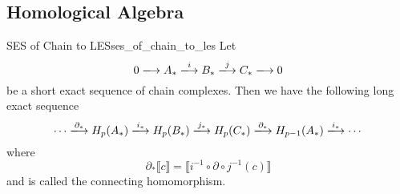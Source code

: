 \documentclass{article}
\begin{document}
\subsection{Homological Algebra}

\begin{theorem}{SES of Chain to LES}{ses_of_chain_to_les}
    Let
    \[ 0 \xlongrightarrow{} A_* \xlongrightarrow{i} B_* \xlongrightarrow{j} C_* \xlongrightarrow{} 0 \]
    be a short exact sequence of chain complexes.
    Then we have the following long exact sequence
    \[ \cdots \xlongrightarrow{\partial_*} H_p(A_*) \xlongrightarrow{i_*} H_p(B_*) \xlongrightarrow{j_*} H_p(C_*) \xlongrightarrow{\partial_*} H_{p-1}(A_*) \xlongrightarrow{i_*} \cdots \]
    where
    \[ \partial_*\llbracket c \rrbracket = \llbracket i^{-1} \circ \partial \circ j^{-1}(c) \rrbracket \]
    and is called the connecting homomorphism.
\end{theorem}
\end{document}
